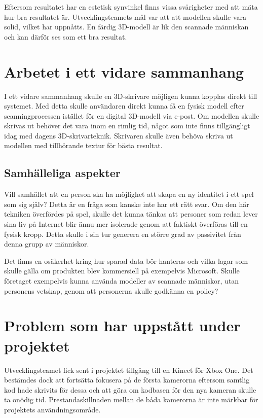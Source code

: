 \documentclass[a4paper,12pt,oneside,final]{extbook}
\begin{document}
Eftersom resultatet har en estetisk synvinkel finns vissa svårigheter med att mäta hur bra resultatet är. Utvecklingsteamets mål var att att modellen skulle vara solid, vilket har uppnåtts. En färdig 3D-modell är lik den scannade människan och kan därför ses som ett bra resultat.

\section{Arbetet i ett vidare sammanhang}
I ett vidare sammanhang skulle en 3D-skrivare möjligen kunna kopplas direkt till systemet. Med detta skulle användaren direkt kunna få en fysisk modell efter scanningprocessen istället för en digital 3D-modell via e-post. Om modellen skulle skrivas ut behöver det vara inom en rimlig tid, något som inte finns tillgängligt idag med dagens 3D-skrivarteknik. Skrivaren skulle även behöva skriva ut modellen med tillhörande textur för bästa resultat. 

\subsection{Samhälleliga aspekter}
Vill samhället att en person ska ha möjlighet att skapa en ny identitet i ett spel som sig själv? Detta är en fråga som kanske inte har ett rätt svar. Om den här tekniken överfördes på spel, skulle det kunna tänkas att personer som redan lever sina liv på Internet blir ännu mer isolerade genom att faktiskt överföras till en fysisk kropp. Detta skulle i sin tur generera en större grad av passivitet från denna grupp av människor.

Det finns en osäkerhet kring hur sparad data bör hanteras och vilka lagar som skulle gälla om produkten blev kommersiell på exempelvis Microsoft. 
Skulle företaget exempelvis kunna använda modeller av scannade människor, utan personens vetskap, genom att personerna skulle godkänna en policy?

\section {Problem som har uppstått under projektet}
Utvecklingsteamet fick sent i projektet tillgång till en Kinect för Xbox One. Det bestämdes dock att fortsätta fokusera på de första kamerorna eftersom samtlig kod hade skrivits för dessa och att göra om kodbasen för den nya kameran skulle ta onödig tid. Prestandaskillnaden mellan de båda kamerorna är inte märkbar för projektets användningsområde.
\end{document}
